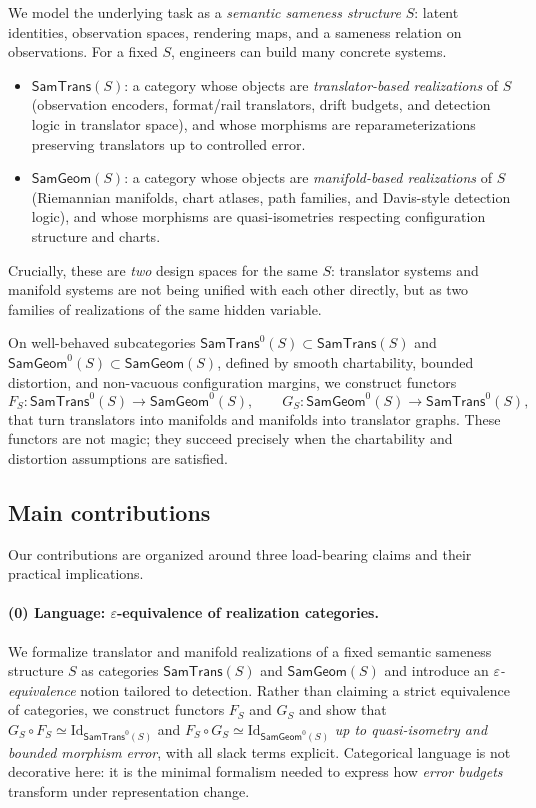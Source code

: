 \documentclass[11pt]{article}
\newcommand{\SamTrans}{\mathsf{SamTrans}}
\newcommand{\SamGeom}{\mathsf{SamGeom}}
\begin{document}
We model the underlying task as a \emph{semantic sameness structure} $S$:
latent identities, observation spaces, rendering maps, and a sameness relation on observations.  For
a fixed $S$, engineers can build many concrete systems.

\begin{itemize}
  \item $\SamTrans(S)$: a category whose objects are \emph{translator-based realizations} of $S$
  (observation encoders, format/rail translators, drift budgets, and detection logic in translator
  space), and whose morphisms are reparameterizations preserving translators up to controlled
  error.
  \item $\SamGeom(S)$: a category whose objects are \emph{manifold-based realizations} of $S$
  (Riemannian manifolds, chart atlases, path families, and Davis-style detection logic), and whose
  morphisms are quasi-isometries respecting configuration structure and charts.
\end{itemize}

Crucially, these are \emph{two} design spaces for the same $S$: translator systems and manifold
systems are not being unified with each other directly, but as two families of realizations of the
same hidden variable.

On well-behaved subcategories $\SamTrans^0(S) \subset \SamTrans(S)$ and
$\SamGeom^0(S) \subset \SamGeom(S)$, defined by smooth chartability, bounded distortion, and
non-vacuous configuration margins, we construct functors
\[
F_S : \SamTrans^0(S) \to \SamGeom^0(S),
\qquad
G_S : \SamGeom^0(S) \to \SamTrans^0(S),
\]
that turn translators into manifolds and manifolds into translator graphs.  These functors are not
magic; they succeed precisely when the chartability and distortion assumptions are satisfied.

\subsection{Main contributions}

Our contributions are organized around three load-bearing claims and their practical implications.

\paragraph{(0) Language: $\varepsilon$-equivalence of realization categories.}
We formalize translator and manifold realizations of a fixed semantic sameness structure $S$ as
categories $\SamTrans(S)$ and $\SamGeom(S)$ and introduce an \emph{$\varepsilon$-equivalence} notion
tailored to detection.  Rather than claiming a strict equivalence of categories, we construct
functors $F_S$ and $G_S$ and show that
$G_S \circ F_S \simeq \mathrm{Id}_{\SamTrans^0(S)}$ and
$F_S \circ G_S \simeq \mathrm{Id}_{\SamGeom^0(S)}$ \emph{up to quasi-isometry and bounded morphism
error}, with all slack terms explicit.  Categorical language is not decorative here: it is the
minimal formalism needed to express how \emph{error budgets} transform under representation change.
\end{document}
